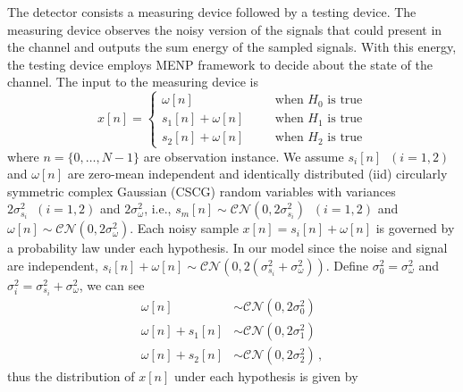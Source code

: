 The detector consists a measuring device followed by a testing device. 
The measuring device observes the noisy version of the signals that could present in the channel and outputs the sum energy of the sampled signals.
With this energy, the testing device employs MENP framework to decide about the state of the channel.
The input to the measuring device is 
\begin{equation}
  x[n] = 
  \begin{cases}
	\omega[n]\;\;\;\;\;\;&\text{when ${H}_0$ is true}\\
	s_1[n]+\omega[n]\;\;\;\;\;\;&\text{when ${H}_1$ is true}\\
	s_2[n]+\omega[n]\;\;\;\;\;\;&\text{when ${H}_2$ is true}
  \end{cases}
\end{equation}
where $n = \{0, \ldots, N-1\}$ are observation instance. 
We assume  $s_i[n]\;\;(i=1, 2)$ and $\omega[n]$ are zero-mean independent and identically distributed (iid) circularly symmetric complex Gaussian (CSCG) random variables with variances $2\sigma_{s_i}^2\;\;(i=1, 2)$ and $2\sigma_{\omega}^2$, i.e., $s_m[n] \sim \mathcal{CN}(0, 2\sigma_{s_i}^2)\;\;(i=1, 2)$ and $\omega[n] \sim \mathcal{CN}(0, 2\sigma_{\omega}^2)$.
Each noisy sample $x[n] = s_i[n] + \omega[n]$ is governed by a probability law under each hypothesis. In our model
since the noise and signal are independent, $s_i[n]+\omega[n] \sim \mathcal{CN}(0, 2(\sigma_{s_i}^2 + \sigma_\omega^2))$.  Define $\sigma_0^2 = \sigma_\omega^2$ and $\sigma_i^2 = \sigma_{s_i}^2 + \sigma_\omega^2$, we can see
\begin{equation}
  \label{1129a1}
  \begin{split}
  \omega[n] &\sim \mathcal{CN}(0, 2\sigma_0^2)\\
  \omega[n] + s_1[n]&\sim \mathcal{CN}(0, 2\sigma_1^2)\\
  \omega[n] + s_2[n]&\sim \mathcal{CN}(0, 2\sigma_2^2) \,,
  \end{split}
\end{equation}
thus the distribution of $x[n]$ under each hypothesis is given by
